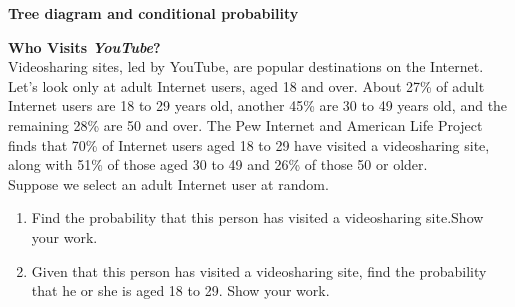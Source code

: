 \documentclass[a4paper, 12pt,twoside]{book}
\begin{document}
\noindent \textbf{Tree diagram and conditional probability}
\vspace{0.6cm}\\
\hspace{-0.5cm}
\colorbox{champagne}{\parbox{\textwidth}{
 \textbf{Who Visits \textit{YouTube}?}
 \vspace{0.3cm}\\
 Video\textendash sharing sites, led by YouTube, are popular destinations on the Internet. Let’s look only at adult Internet users, aged 18 and over. About 27\% of adult Internet users are 18 to 29 years old, another 45\% are 30 to 49 years old, and the remaining 28\% are 50 and over. The Pew Internet and American Life Project finds that 70\% of Internet users aged 18 to 29 have visited a video\textendash sharing site, along with 51\% of those aged 30 to 49 and 26\% of those 50 or older. 
 \vspace{0.3cm}\\
 Suppose we select an adult Internet user at random. 
 \begin{enumerate}
     \item Find the probability that this person has visited a video\textendash sharing site.Show your work.
     \item Given that this person has visited a video\textendash sharing site, find the probability that he or she is aged 18 to 29. Show your work.
 \end{enumerate}
 }}
 \newpage
 
\end{document}
